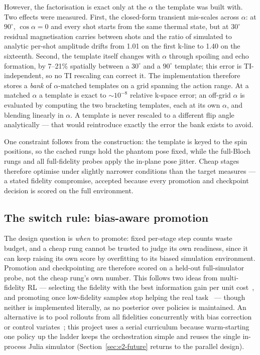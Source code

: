 However, the factorisation is exact only at the
$\alpha$ the template was built with. Two effects were measured. First, the
closed-form transient mis-scales across $\alpha$: at $90^\circ$,
$\cos\alpha=0$ and every shot starts from the same thermal state, but at
$30^\circ$ residual magnetisation carries between shots and the ratio of
simulated to analytic per-shot amplitude drifts from 1.01 on the first
k-line to 1.40 on the sixteenth. Second, the template itself changes with
$\alpha$ through spoiling and echo formation, by 7--21\% spatially between a
$30^\circ$ and a $90^\circ$ template; this error is TI-independent, so no TI
rescaling can correct it. The implementation therefore stores a \emph{bank}
of $\alpha$-matched templates on a grid spanning the action range. At a
matched $\alpha$ a template is exact to ${\sim}10^{-8}$ relative k-space
error; an off-grid $\alpha$ is evaluated by computing the two bracketing
templates, each at its own $\alpha$, and blending linearly in $\alpha$. A
template is never rescaled to a different flip angle analytically --- that
would reintroduce exactly the error the bank exists to avoid.

One constraint follows from the construction: the template is keyed to the
spin positions, so the cached rungs hold the phantom pose fixed, while the
full-Bloch rungs and all full-fidelity probes apply the in-plane pose jitter.
Cheap stages therefore optimise under slightly narrower conditions than the
target measures --- a stated fidelity compromise, accepted because every
promotion and checkpoint decision is scored on the full environment.

\subsection{The switch rule: bias-aware promotion}
\label{sec:e2-mf-switch}

The design question is \emph{when} to promote: fixed per-stage step counts
waste budget, and a cheap rung cannot be trusted to judge its own readiness,
since it can keep raising its own score by overfitting to its biased
simulation environment. Promotion and checkpointing are therefore
scored on a held-out full-simulator probe, not the cheap rung's own number.
This follows two ideas from multi-fidelity RL --- selecting the fidelity with
the best information gain per unit cost~\cite{sifaou_mf_hrl_2025}, and promoting
once low-fidelity samples stop helping the real
task~\cite{cutler_multifidelity_2015} --- though neither is implemented
literally, as no posterior over policies is maintained. An alternative is to
pool rollouts from all fidelities concurrently with bias correction or control
variates~\cite{khairy_control_variates_2024,suryan_multifidelity_gp_2020}; this
project uses a serial curriculum because warm-starting one policy up the ladder
keeps the orchestration simple and reuses the single in-process Julia simulator
(Section~\ref{sec:e2-future} returns to the parallel design).

